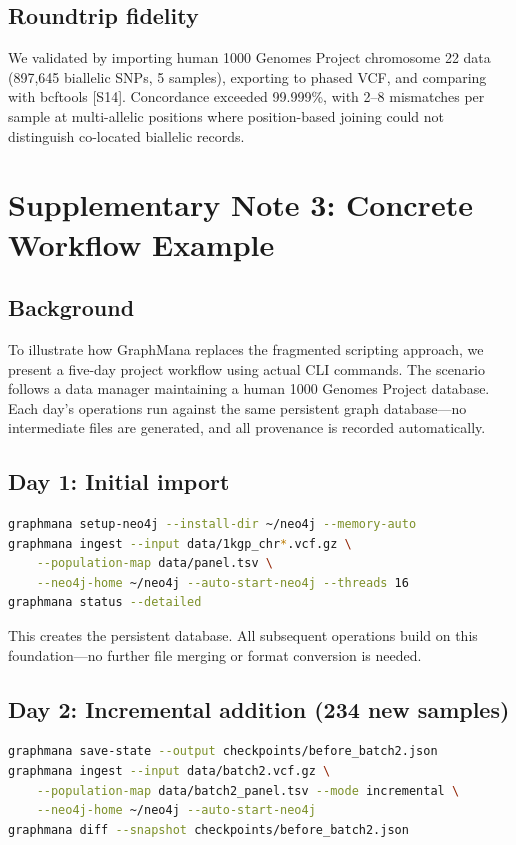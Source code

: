 \documentclass[11pt,a4paper]{article}
\begin{document}
\subsection*{Roundtrip fidelity}

We validated by importing human 1000 Genomes Project chromosome 22 data (897,645 biallelic SNPs, 5 samples), exporting to phased VCF, and comparing with bcftools [S14]. Concordance exceeded 99.999\%, with 2--8 mismatches per sample at multi-allelic positions where position-based joining could not distinguish co-located biallelic records.

\newpage

\section{Supplementary Note 3: Concrete Workflow Example}

\subsection*{Background}

To illustrate how GraphMana replaces the fragmented scripting approach, we present a five-day project workflow using actual CLI commands. The scenario follows a data manager maintaining a human 1000 Genomes Project database. Each day's operations run against the same persistent graph database---no intermediate files are generated, and all provenance is recorded automatically.

\subsection*{Day 1: Initial import}
\begin{lstlisting}[language=bash]
graphmana setup-neo4j --install-dir ~/neo4j --memory-auto
graphmana ingest --input data/1kgp_chr*.vcf.gz \
    --population-map data/panel.tsv \
    --neo4j-home ~/neo4j --auto-start-neo4j --threads 16
graphmana status --detailed
\end{lstlisting}

This creates the persistent database. All subsequent operations build on this foundation---no further file merging or format conversion is needed.

\subsection*{Day 2: Incremental addition (234 new samples)}
\begin{lstlisting}[language=bash]
graphmana save-state --output checkpoints/before_batch2.json
graphmana ingest --input data/batch2.vcf.gz \
    --population-map data/batch2_panel.tsv --mode incremental \
    --neo4j-home ~/neo4j --auto-start-neo4j
graphmana diff --snapshot checkpoints/before_batch2.json
\end{lstlisting}
\end{document}
